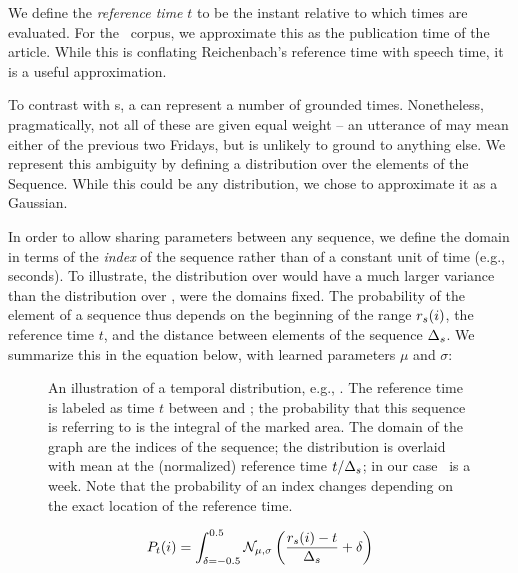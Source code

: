 We define the \textit{reference time} $t$ \cite{key:1947reichenback-temporal}
	to be the instant relative to which times are evaluated.
For the \tempeval\ corpus, we approximate this as the
	publication time of the article.
While this is conflating Reichenbach's reference time with speech time, 
	it is a useful approximation.

To contrast with s, a  can represent a number of grounded
	times.
Nonetheless, pragmatically, not all of these are given equal weight --
	an utterance of  may mean either of the previous two Fridays,
	but is unlikely to ground to anything else.
We represent this ambiguity by defining a distribution over the elements
	of the Sequence.
While this could be any distribution, we chose to approximate it as a
	Gaussian.

In order to allow sharing parameters between any sequence, we define the domain
	in terms of the \textit{index} of the sequence rather than
	of a constant unit of time (e.g., seconds).
To illustrate, the distribution over  would have a much larger
	variance than the distribution over , were the domains
	fixed.
The probability of the  element of a sequence thus depends on
	the beginning of the range $r_s(i)$, 
	the reference time $t$, 
	and the distance between elements of the sequence $\Delta_s$.
We summarize this in the equation below, with learned parameters
	$\mu$ and $\sigma$:

\begin{figure}[t]
\begin{center}
	\resizebox{1.1\hsize}{!}{
		
	}
	\caption{
		\label{fig:distribution}
		An illustration of a temporal distribution, e.g., .
		The reference time is labeled as time $t$ between  and 
			; the probability that this sequence is referring to
			 is the integral of the marked area.
		The domain of the graph are the indices of the sequence;
			the distribution is overlaid with mean at the (normalized) reference time
			$t / \Delta_s$; in our case \seqjump\ is a week.
		Note that the probability of an index changes depending on the exact location
		of the reference time.
	}
\end{center}
\end{figure}

\begin{equation}
\label{eqn:gaussian}
	P_t(i) = 
	\int_{\delta=-0.5}^{0.5}
		\mathcal{N}_{\mu,\sigma}\left(\frac{r_s(i) - t}{\Delta_s} + \delta \right)
\end{equation}

